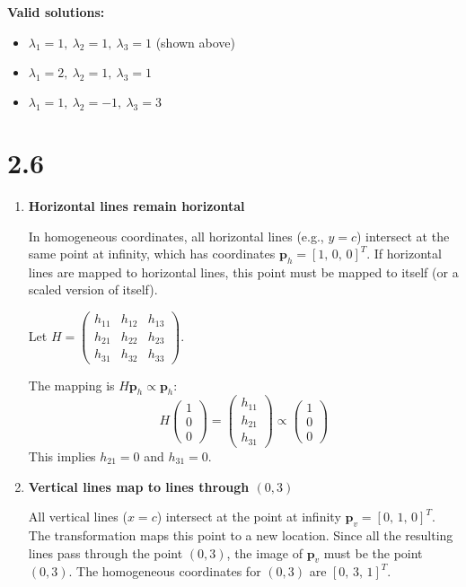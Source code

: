 \documentclass[12pt]{article}
\begin{document}
\textbf{Valid solutions:}
\begin{itemize}
    \item $\lambda_1 = 1,\ \lambda_2 = 1,\ \lambda_3 = 1$ \hspace{1em} (shown above)
    \item $\lambda_1 = 2,\ \lambda_2 = 1,\ \lambda_3 = 1$
    \item $\lambda_1 = 1,\ \lambda_2 = -1,\ \lambda_3 = 3$
\end{itemize}

\section*{2.6}


\begin{enumerate}
    \item \textbf{Horizontal lines remain horizontal}

    In homogeneous coordinates, all horizontal lines (e.g., $y = c$) intersect at the same point at infinity, which has coordinates $\mathbf{p}_h = [1,\,0,\,0]^T$. If horizontal lines are mapped to horizontal lines, this point must be mapped to itself (or a scaled version of itself).

    Let $H = \begin{pmatrix}
        h_{11} & h_{12} & h_{13} \\
        h_{21} & h_{22} & h_{23} \\
        h_{31} & h_{32} & h_{33}
    \end{pmatrix}$.

    The mapping is $H \mathbf{p}_h \propto \mathbf{p}_h$:
    \[
    H \begin{pmatrix} 1 \\ 0 \\ 0 \end{pmatrix} = \begin{pmatrix} h_{11} \\ h_{21} \\ h_{31} \end{pmatrix} \propto \begin{pmatrix} 1 \\ 0 \\ 0 \end{pmatrix}
    \]
    This implies $h_{21} = 0$ and $h_{31} = 0$.

    \item \textbf{Vertical lines map to lines through $(0, 3)$}

    All vertical lines ($x = c$) intersect at the point at infinity $\mathbf{p}_v = [0,\,1,\,0]^T$. The transformation maps this point to a new location. Since all the resulting lines pass through the point $(0, 3)$, the image of $\mathbf{p}_v$ must be the point $(0, 3)$. The homogeneous coordinates for $(0, 3)$ are $[0,\,3,\,1]^T$.


\end{enumerate}
\end{document}
